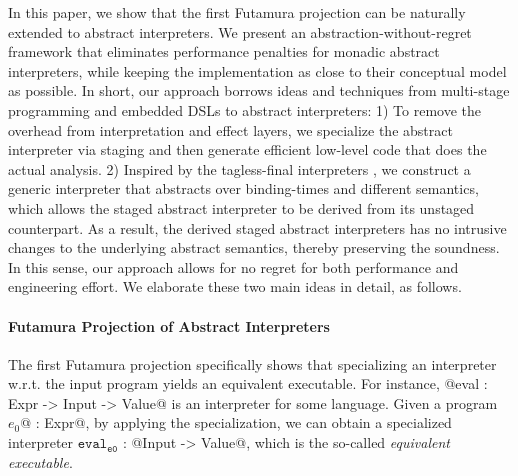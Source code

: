 In this paper, we show that the first Futamura projection can be naturally
extended to abstract interpreters. We present an abstraction-without-regret
framework that eliminates performance penalties for monadic abstract
interpreters, while keeping the implementation as close to their conceptual
model as possible.
In short, our approach borrows ideas and techniques from multi-stage
programming and embedded DSLs to abstract interpreters:  1) To remove the
overhead from interpretation and effect layers, we specialize the abstract
interpreter via staging and then generate efficient low-level code that does
the actual analysis. 2) Inspired by the tagless-final interpreters
\cite{DBLP:journals/jfp/CaretteKS09}, we construct a generic interpreter that
abstracts over binding-times and different semantics, which allows the staged
abstract interpreter to be derived from its unstaged counterpart.
As a result, the derived staged abstract interpreters has no intrusive changes
to the underlying abstract semantics, thereby preserving the soundness.
In this sense, our approach allows for no regret for both performance and
engineering effort. We elaborate these two main ideas in detail, as follows.




\paragraph{Futamura Projection of Abstract Interpreters}

The first Futamura projection specifically shows that specializing an
interpreter w.r.t. the input program yields an equivalent executable. For
instance, @eval : Expr -> Input -> Value@ is an interpreter for some language.
Given a program $e_0$@ : Expr@, by applying the specialization, we can
obtain a specialized interpreter $\texttt{eval}_{\texttt{e0}}$ : @Input -> Value@,
which is the so-called \textit{equivalent executable}.


